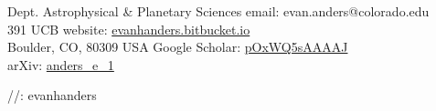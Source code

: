 \documentclass[11pt,letterpaper,sans]{moderncv} %
\newcommand{\leftright}[2]{#1 \hfill #2\\}
\newcommand{\rtxt}[1]{\raggedleft \noindent #1 \\ \raggedright}
\begin{document}

\makecvtitle %
\leftright{Dept. Astrophysical \& Planetary Sciences}{email: evan.anders@colorado.edu}
\leftright{391 UCB}{website: \href{http://evanhanders.bitbucket.io}{evanhanders.bitbucket.io}}
\leftright{Boulder, CO, 80309 USA}{Google Scholar: \href{https://scholar.google.com/citations?user=pOxWQ5sAAAAJ}{pOxWQ5sAAAAJ}}
\rtxt{arXiv: \href{https://arxiv.org/a/anders\_e\_1.html}{anders\_e\_1}}
\rtxt{\href{https://www.linkedin.com/in/evanhanders/}{\faLinkedinSquare}/\href{https://github.com/evanhanders/}{\faGithubSquare}/\href{https://bitbucket.org/evanhanders/?visibility=public}{\faBitbucketSquare}: evanhanders}





\newpage








\end{document}
